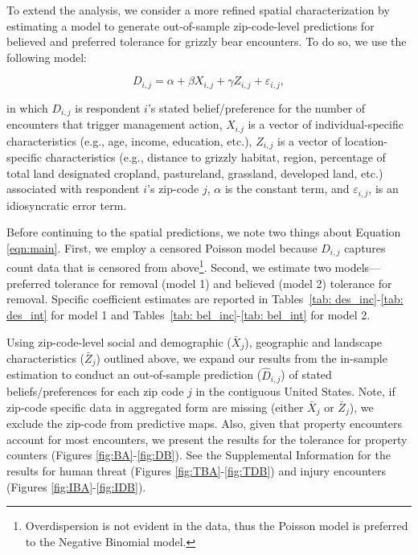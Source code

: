 \documentclass[english,12pt]{article}
\begin{document}
To extend the analysis, we consider a more refined spatial characterization by estimating a model to generate out-of-sample zip-code-level predictions for believed and preferred tolerance for grizzly bear encounters. To do so, we use the following model:

\begin{equation}
    D_{i,j} = \alpha + \beta X_{i,j} + \gamma Z_{i,j} + \varepsilon_{i,j},
    \label{eqn:main}
\end{equation}

in which $D_{i,j}$ is respondent $i$'s stated belief/preference for the number of encounters that trigger management action, $X_{i.j}$ is a vector of individual-specific characteristics (e.g., age, income, education, etc.), $Z_{i,j}$ is a vector of location-specific characteristics (e.g., distance to grizzly habitat, region, percentage of total land designated cropland, pastureland, grassland, developed land, etc.) associated with respondent $i$'s zip-code $j$, $\alpha$ is the constant term, and $\varepsilon_{i,j}$, is an idiosyncratic error term.

Before continuing to the spatial predictions, we note two things about Equation \ref{eqn:main}. First, we employ a censored Poisson model because $D_{i,j}$ captures count data that is censored from above\footnote{Overdispersion is not evident in the data, thus the Poisson model is preferred to the Negative Binomial model.}. Second, we estimate two models--- preferred tolerance for removal (model 1) and believed (model 2) tolerance for removal. Specific coefficient estimates are reported in Tables~\ref{tab: des_inc}-\ref{tab: des_int} for model 1 and Tables~\ref{tab: bel_inc}-\ref{tab: bel_int} for model 2.

Using zip-code-level social and demographic ($\bar{X}_j$), geographic and landscape characteristics ($\bar{Z}_j$) outlined above, we expand our results from the in-sample estimation to conduct an out-of-sample prediction ($\hat{D}_{i,j}$) of stated beliefs/preferences for each zip code $j$ in the contiguous United States. Note, if zip-code specific data in aggregated form are missing (either $\bar{X}_j$ or $\bar{Z}_j$), we exclude the zip-code from predictive maps. Also, given that property encounters account for most encounters, we present the results for the tolerance for property counters (Figures \ref{fig:BA}-\ref{fig:DB}). See the Supplemental Information for the results for human threat (Figures \ref{fig:TBA}-\ref{fig:TDB}) and injury encounters (Figures \ref{fig:IBA}-\ref{fig:IDB}).
\end{document}
